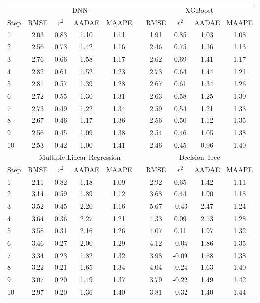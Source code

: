 \documentclass[]{interact}
\theoremstyle{plain}%
\theoremstyle{definition}
\theoremstyle{remark}
\begin{document}
\begin{table}[H]
{\begin{tabular}{lccccccccc} \toprule
  &  \multicolumn{4}{c}{DNN}  & \multicolumn{1}{c}{\quad} & \multicolumn{4}{c}{XGBoost} \\ \cmidrule{2-10}
 Step  &  RMSE  &  $r^2$  &  AADAE & MAAPE & \quad &  RMSE  &  $r^2$  &  AADAE & MAAPE \\ \midrule
1 & 2.03 & 0.83 & 1.10 & 1.11 & \quad & 1.91 & 0.85 & 1.03 & 1.08 \\ 
2 & 2.56 & 0.73 & 1.42 & 1.16 & \quad & 2.46 & 0.75 & 1.36 & 1.13 \\ 
3 & 2.76 & 0.66 & 1.58 & 1.17 & \quad & 2.62 & 0.69 & 1.41 & 1.17 \\ 
4 & 2.82 & 0.61 & 1.52 & 1.23 & \quad & 2.73 & 0.64 & 1.44 & 1.21 \\ 
5 & 2.81 & 0.57 & 1.39 & 1.28 & \quad & 2.67 & 0.61 & 1.34 & 1.26 \\ 
6 & 2.72 & 0.55 & 1.30 & 1.31 & \quad & 2.63 & 0.58 & 1.25 & 1.30 \\ 
7 & 2.73 & 0.49 & 1.22 & 1.34 & \quad & 2.59 & 0.54 & 1.21 & 1.33 \\ 
8 & 2.67 & 0.46 & 1.17 & 1.36 & \quad & 2.56 & 0.50 & 1.12 & 1.35 \\ 
9 & 2.56 & 0.45 & 1.09 & 1.38 & \quad & 2.54 & 0.46 & 1.05 & 1.38 \\ 
10 & 2.53 & 0.42 & 1.00 & 1.41 & \quad & 2.46 & 0.45 & 0.96 & 1.40 \\ 
\bottomrule
  &  \multicolumn{4}{c}{Multiple Linear Regression}  & \multicolumn{1}{c}{\quad} & \multicolumn{4}{c}{Decision Tree} \\ \cmidrule{2-10}
 Step  &  RMSE  &  $r^2$  &  AADAE & MAAPE & \quad &  RMSE  &  $r^2$  &  AADAE & MAAPE \\ \midrule
1 & 2.11 & 0.82 & 1.18 & 1.09 & \quad & 2.92 & 0.65 & 1.42 & 1.11 \\ 
2 & 3.14 & 0.59 & 1.89 & 1.12 & \quad & 3.68 & 0.44 & 1.90 & 1.18 \\ 
3 & 3.52 & 0.45 & 2.20 & 1.16 & \quad & 5.67 & -0.43 & 2.47 & 1.24 \\ 
4 & 3.64 & 0.36 & 2.27 & 1.21 & \quad & 4.33 & 0.09 & 2.13 & 1.28 \\ 
5 & 3.58 & 0.31 & 2.16 & 1.26 & \quad & 4.07 & 0.11 & 1.97 & 1.32 \\ 
6 & 3.46 & 0.27 & 2.00 & 1.29 & \quad & 4.12 & -0.04 & 1.86 & 1.35 \\ 
7 & 3.34 & 0.23 & 1.82 & 1.32 & \quad & 3.98 & -0.09 & 1.68 & 1.38 \\ 
8 & 3.22 & 0.21 & 1.65 & 1.34 & \quad & 4.04 & -0.24 & 1.63 & 1.40 \\ 
9 & 3.07 & 0.20 & 1.49 & 1.37 & \quad & 3.79 & -0.22 & 1.49 & 1.42 \\ 
10 & 2.97 & 0.20 & 1.36 & 1.40 & \quad & 3.81 & -0.32 & 1.40 & 1.44 \\ 
\bottomrule
\end{tabular}}
\label{table:ArrivalDeviationPrediction}
\end{table}
\end{document}
